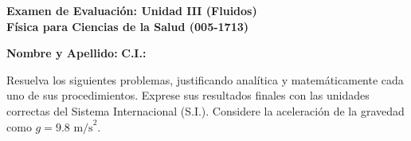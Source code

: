 \documentclass[11pt,letterpaper]{article}
\begin{document}
\begin{center}
    \textbf{\Large Examen de Evaluación: Unidad III (Fluidos)}\\
    \vspace{0.2cm}
    \textbf{Física para Ciencias de la Salud (005-1713)}\\
\end{center}

\vspace{0.5cm}
\noindent \textbf{Nombre y Apellido:} \underline{\hspace{7cm}} \hfill \textbf{C.I.:} \underline{\hspace{4cm}}

\vspace{0.5cm}
\noindent Resuelva los siguientes problemas, justificando analítica y matemáticamente cada uno de sus procedimientos. Exprese sus resultados finales con las unidades correctas del Sistema Internacional (S.I.). Considere la aceleración de la gravedad como $g = 9.8 \text{ m/s}^2$.

\vspace{0.5cm}
\end{document}
